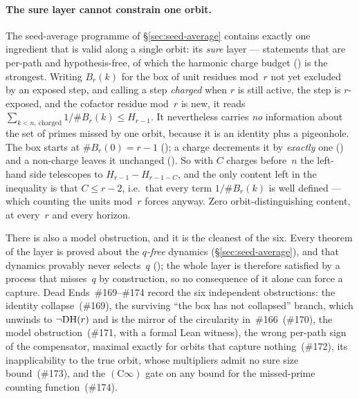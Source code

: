 \paragraph{The sure layer cannot constrain one orbit.}
The seed-average programme of \S\ref{sec:seed-average} contains exactly
one ingredient that is valid along a single orbit: its \emph{sure} layer
--- statements that are per-path and hypothesis-free, of which the
harmonic charge budget
()
is the strongest.  Writing $B_r(k)$ for the box of unit residues mod~$r$
not yet excluded by an exposed step, and calling a step \emph{charged}
when $r$ is still active, the step is $r$-exposed, and the cofactor
residue mod~$r$ is new, it reads
$\sum_{k<n,\ \mathrm{charged}} 1/\#B_r(k) \le H_{r-1}$.  It nevertheless
carries \emph{no} information about the set of primes missed by one
orbit, because it is an identity plus a pigeonhole.  The box starts at
$\#B_r(0) = r-1$
(); a charge
decrements it by \emph{exactly} one
()
and a non-charge leaves it unchanged
().
So with $C$ charges before~$n$ the left-hand side telescopes to
$H_{r-1} - H_{r-1-C}$, and the only content left in the inequality is that
$C \leq r-2$, i.e.\ that every term $1/\#B_r(k)$ is well defined --- which
counting the units mod~$r$ forces anyway.  Zero orbit-distinguishing
content, at every~$r$ and every horizon.

There is also a model obstruction, and it is the cleanest of the six.
Every theorem of the layer is proved about the \emph{$q$-free} dynamics
(\S\ref{sec:seed-average}), and that dynamics provably never selects~$q$
(); the
whole layer is therefore satisfied by a process that misses~$q$ by
construction, so no consequence of it alone can force a capture.  Dead
Ends~\#169--\#174 record the six independent obstructions: the identity
collapse~(\#169), the surviving ``the box has not collapsed'' branch,
which unwinds to $\neg\mathrm{DH}(r)$ and is the mirror of the circularity
in~\#166~(\#170), the model obstruction~(\#171, with a formal Lean
witness), the wrong per-path sign of the compensator, maximal exactly for
orbits that capture nothing~(\#172), its inapplicability to the true
orbit, whose multipliers admit no sure size bound~(\#173), and the
$(\mathrm{C}\infty)$ gate on any bound for the missed-prime counting
function~(\#174).

